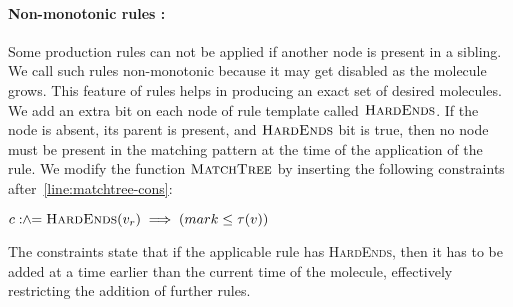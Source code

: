\paragraph{Non-monotonic rules :}
Some production rules can not be applied if another node is present in a sibling.
We call such rules non-monotonic because it may get disabled as the molecule grows.
This feature of rules helps in producing an exact set of desired molecules.
We add an extra bit on each node of rule
template called $\textsc{HardEnds}$.
If the node is absent, its parent is present, and  $\textsc{HardEnds}$ bit is true, then
no node must be present in the matching pattern at the time of the application of the rule.
We modify the function $\textsc{MatchTree}$ by inserting the following constraints after~\ref{line:matchtree-cons}:
\begin{minipage}{1.0\linewidth}
\begin{algorithmic}[1]
  \vspace{1ex}
  \State $c \mathrel{:\hspace{-3pt}\land\hspace{-3pt}=} \textsc{HardEnds}(v_r) \implies (mark \leq \tau(v))$
\end{algorithmic}  
\end{minipage}
The constraints state that if the applicable rule has \textsc{HardEnds}, then it has to be added at a time earlier than the current time of the molecule, effectively restricting the addition of further rules.



